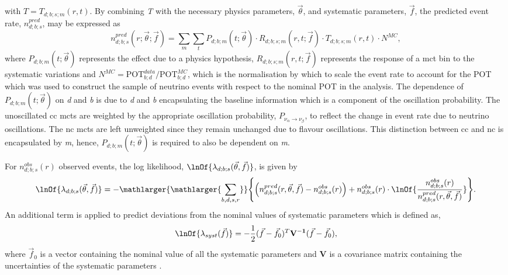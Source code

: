 with $T = T_{d;b;s;m}(r, t)$. By combining \textit{T} with the necessary physics parameters, $\vec{\theta}$, and systematic parameters, $\vec{f}$, the predicted event rate, $n^{pred}_{d;b;s}$, may be expressed as
\begin{equation}
n_{d;b;s}^{pred}(r; \vec{\theta}; \vec{f}) =
   \sum_{m} \sum_{t}  P_{d;b;m}(t; \vec{\theta}) \cdot R_{d;b;s;m}(r,t; \vec{f}) \cdot T_{d;b;s;m}(r,t) \cdot N^{MC},
   \label{eq:valor_npred}
\end{equation}
where $P_{d;b;m}(t; \vec{\theta})$ represents the effect due to a physics hypothesis, $R_{d;b;s;m}(r,t; \vec{f})$ represents the response of a \gls{mct} bin to the systematic variations and $N^{MC} = \mbox{POT}_{b;d}^{data}/\mbox{POT}_{b;d}^{MC}$, which is the normalisation by which to scale the event rate to account for the POT which was used to construct the sample of neutrino events with respect to the nominal POT in the analysis. The dependence of $P_{d;b;m}(t; \vec{\theta})$ on \textit{d} and \textit{b} is due to \textit{d} and \textit{b} encapsulating the baseline information which is a component of the oscillation probability. The unoscillated \gls{cc} \glspl{mct} are weighted by the appropriate oscillation probability, $P_{\nu_{\alpha} \rightarrow \nu_{\beta}}$, to reflect the change in event rate due to neutrino oscillations. The \gls{nc} \glspl{mct} are left unweighted since they remain unchanged due to flavour oscillations. This distinction between \gls{cc} and \gls{nc} is encapsulated by \textit{m}, hence, $P_{d;b;m}(t; \vec{\theta})$ is required to also be dependent on \textit{m}. 

For $n_{d ; b ; s}^{obs}(r)$ observed events, the log likelihood, $\lnOf{\lambda_{d;b;s}(\vec \theta, \vec f)}$, is given by
\begin{equation}
    \lnOf{\lambda_{d;b;s}(\vec \theta, \vec f)} = - \mathlarger{\mathlarger{\sum_{b,d,s,r}}} \Bigg \{ \Big (n_{d;b;s}^{pred}(r,\vec{\theta},\vec{f})
    - n_{d ; b ; s}^{obs}(r) \Big) + n_{d ; b ; s}^{obs}(r) \cdot \lnOf{\frac{n_{d ; b ; s}^{obs}(r)}{n_{d ; b ; s}^{p r e d}(r , \vec{\theta} , \vec{f})}} \Bigg \}.
\end{equation}
An additional term is applied to predict deviations from the nominal values of systematic parameters which is defined as,
\begin{equation}
    \lnOf{\lambda_{syst}(\vec{f})} = -\frac{1}{2} (\vec{f} - \vec{f}_0)^T \mathbf{V^{-1}} (\vec{f} - \vec{f}_0),
\end{equation}
where $\vec{f}_0$ is a vector containing the nominal value of all the systematic parameters and \textbf{V} is a covariance matrix containing the uncertainties of the systematic parameters \cite{VALOR_dune}. 

